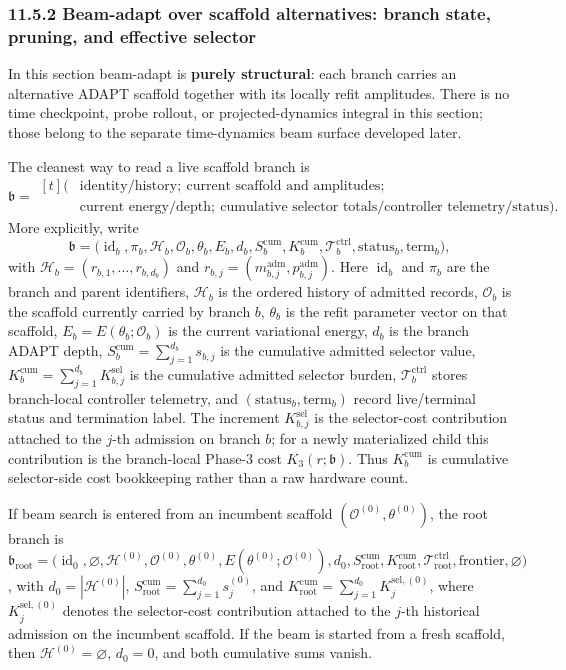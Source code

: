 \documentclass[11pt]{article}
\begin{document}
\subsubsection*{11.5.2 Beam-adapt over scaffold alternatives: branch state, pruning, and effective selector}
In this section beam-adapt is \textbf{purely structural}: each branch carries an alternative ADAPT scaffold together with its locally refit amplitudes. There is no time checkpoint, probe rollout, or projected-dynamics integral in this section; those belong to the separate time-dynamics beam surface developed later.

The cleanest way to read a live scaffold branch is
\[
\mathfrak b=
\begin{aligned}[t]
\bigl(&\text{identity/history};\ \text{current scaffold and amplitudes};\\
&\text{current energy/depth};\ \text{cumulative selector totals/controller telemetry/status}\bigr).
\end{aligned}
\]
More explicitly, write
\[
\mathfrak b=\bigl(\operatorname{id}_b,\pi_b,\mathcal H_b,\mathcal O_b,\theta_b,E_b,d_b,S_b^{\mathrm{cum}},K_b^{\mathrm{cum}},\mathcal T_b^{\mathrm{ctrl}},\mathrm{status}_b,\mathrm{term}_b\bigr),
\]
with \(\mathcal H_b=(r_{b,1},\dots,r_{b,d_b})\) and \(r_{b,j}=(m_{b,j}^{\mathrm{adm}},p_{b,j}^{\mathrm{adm}})\). Here \(\operatorname{id}_b\) and \(\pi_b\) are the branch and parent identifiers, \(\mathcal H_b\) is the ordered history of admitted records, \(\mathcal O_b\) is the scaffold currently carried by branch \(b\), \(\theta_b\) is the refit parameter vector on that scaffold, \(E_b=E(\theta_b;\mathcal O_b)\) is the current variational energy, \(d_b\) is the branch ADAPT depth, \(S_b^{\mathrm{cum}}=\sum_{j=1}^{d_b}s_{b,j}\) is the cumulative admitted selector value, \(K_b^{\mathrm{cum}}=\sum_{j=1}^{d_b}K_{b,j}^{\mathrm{sel}}\) is the cumulative admitted selector burden, \(\mathcal T_b^{\mathrm{ctrl}}\) stores branch-local controller telemetry, and \((\mathrm{status}_b,\mathrm{term}_b)\) record live/terminal status and termination label. The increment \(K_{b,j}^{\mathrm{sel}}\) is the selector-cost contribution attached to the \(j\)-th admission on branch \(b\); for a newly materialized child this contribution is the branch-local Phase-3 cost \(K_3(r;\mathfrak b)\). Thus \(K_b^{\mathrm{cum}}\) is cumulative selector-side cost bookkeeping rather than a raw hardware count.

If beam search is entered from an incumbent scaffold \((\mathcal O^{(0)},\theta^{(0)})\), the root branch is \(\mathfrak b_{\mathrm{root}}=\bigl(\operatorname{id}_0,\varnothing,\mathcal H^{(0)},\mathcal O^{(0)},\theta^{(0)},E(\theta^{(0)};\mathcal O^{(0)}),d_0,S_{\mathrm{root}}^{\mathrm{cum}},K_{\mathrm{root}}^{\mathrm{cum}},\mathcal T_{\mathrm{root}}^{\mathrm{ctrl}},\mathrm{frontier},\varnothing\bigr)\), with \(d_0=|\mathcal H^{(0)}|\), \(S_{\mathrm{root}}^{\mathrm{cum}}=\sum_{j=1}^{d_0}s_j^{(0)}\), and \(K_{\mathrm{root}}^{\mathrm{cum}}=\sum_{j=1}^{d_0}K_j^{\mathrm{sel},(0)}\), where \(K_j^{\mathrm{sel},(0)}\) denotes the selector-cost contribution attached to the \(j\)-th historical admission on the incumbent scaffold. If the beam is started from a fresh scaffold, then \(\mathcal H^{(0)}=\varnothing\), \(d_0=0\), and both cumulative sums vanish.
\end{document}
